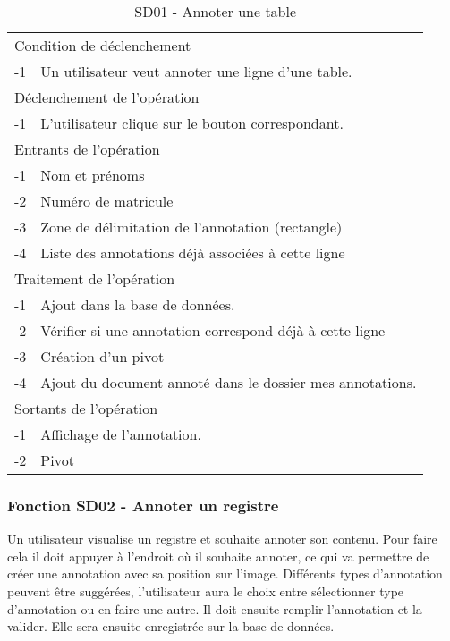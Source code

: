 \documentclass[a4paper]{article}
\begin{document}
\begin{table}[H]
  \centering
   \small
	\begin{tabular}{|c|p{12cm}|}
   		\hline
   			\rowcolor{lightgray}\multicolumn{2}{|c|}{\textbf{SD01 - Annoter une table}} \\
   		\hline
   			\multicolumn{2}{|l|}{Condition de d\'eclenchement} \\
   		\hline
   		-1 & Un utilisateur veut annoter une ligne d'une table. \\
   		\hline
   			\multicolumn{2}{|l|}{D\'eclenchement de l'op\'eration} \\
   		\hline
   			-1 & L'utilisateur clique sur le bouton correspondant. \\
   		\hline
   			\multicolumn{2}{|l|}{Entrants de l'op\'eration} \\
   		\hline
   			-1 & Nom et pr\'enoms \\
        	-2 & Num\'ero de matricule \\ 
        	-3 & Zone de d\'elimitation de l'annotation (rectangle) \\
            -4 & Liste des annotations d\'ej\`a associ\'ees \`a cette ligne \\
   		\hline
   			\multicolumn{2}{|l|}{Traitement de l'op\'eration} \\
  		\hline
   			-1 & Ajout dans la base de donn\'ees. \\
        	-2 & V\'erifier si une annotation correspond d\'ej\`a \`a cette ligne \\
        	-3 & Cr\'eation d'un pivot \\
            -4 & Ajout du document annot\'e dans le dossier mes annotations. \\
   		\hline
   			\multicolumn{2}{|l|}{Sortants de l'op\'eration} \\
   		\hline
   			-1 & Affichage de l'annotation. \\
            -2 & Pivot \\
   		\hline
	\end{tabular}
  \caption{SD01 - Annoter une table}
  \normalsize
  \label{tab:annoter_table}
\end{table}

\subsubsection{Fonction SD02 - Annoter un registre}

Un utilisateur visualise un registre et souhaite annoter son contenu. Pour faire cela il doit appuyer à l’endroit où il souhaite annoter, ce qui va permettre de créer une annotation avec sa position sur l’image. Différents types d’annotation peuvent être suggérées, l’utilisateur aura le choix entre sélectionner type d’annotation ou en faire une autre. Il doit ensuite remplir l’annotation et la valider. Elle sera ensuite enregistrée sur la base de données.\\
\end{document}
